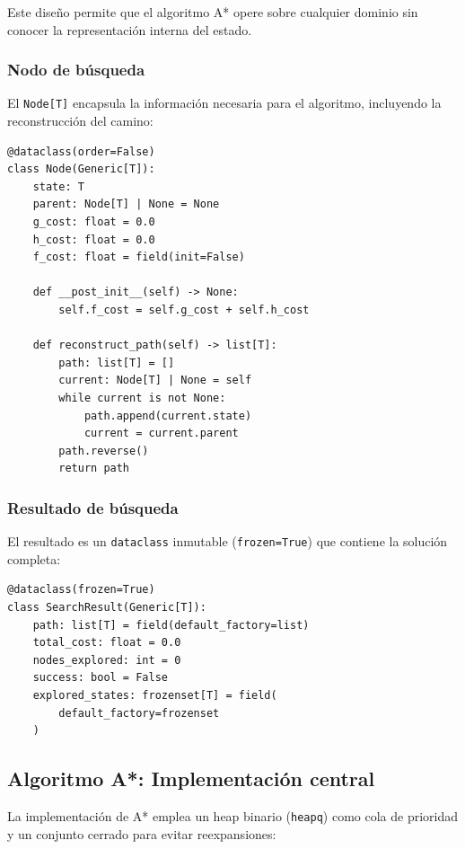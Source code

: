 Este diseño permite que el algoritmo A* opere sobre cualquier dominio sin conocer la representación interna del estado.

\subsubsection{Nodo de búsqueda}

El \texttt{Node[T]} encapsula la información necesaria para el algoritmo, incluyendo la reconstrucción del camino:

\begin{lstlisting}[caption={Estructura del nodo de búsqueda}, label={lst:node}]
@dataclass(order=False)
class Node(Generic[T]):
    state: T
    parent: Node[T] | None = None
    g_cost: float = 0.0
    h_cost: float = 0.0
    f_cost: float = field(init=False)

    def __post_init__(self) -> None:
        self.f_cost = self.g_cost + self.h_cost

    def reconstruct_path(self) -> list[T]:
        path: list[T] = []
        current: Node[T] | None = self
        while current is not None:
            path.append(current.state)
            current = current.parent
        path.reverse()
        return path
\end{lstlisting}

\subsubsection{Resultado de búsqueda}

El resultado es un \texttt{dataclass} inmutable (\texttt{frozen=True}) que contiene la solución completa:

\begin{lstlisting}[caption={Contenedor de resultados}, label={lst:result}]
@dataclass(frozen=True)
class SearchResult(Generic[T]):
    path: list[T] = field(default_factory=list)
    total_cost: float = 0.0
    nodes_explored: int = 0
    success: bool = False
    explored_states: frozenset[T] = field(
        default_factory=frozenset
    )
\end{lstlisting}

\subsection{Algoritmo A*: Implementación central}

La implementación de A* emplea un heap binario (\texttt{heapq}) como cola de prioridad y un conjunto cerrado para evitar reexpansiones:

